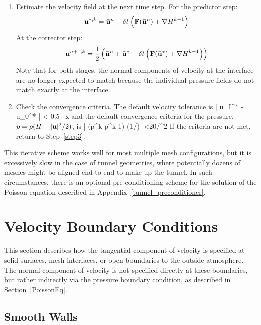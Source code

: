 \begin{enumerate}
\item Estimate the velocity field at the next time step. For the predictor step:
\begin{equation}
\label{eqn_RK1}
\mathbf{u}^{*,k} = \bar{\mathbf{u}}^n - \delta t \left( \mathbf{F}(\bar{\mathbf{u}}^n) + {\nabla H}^{k-1} \right)
\end{equation}
At the corrector step:
\begin{equation}
\label{eqn_RK2}
\mathbf{u}^{n+1,k} = \frac{1}{2} \left( \bar{\mathbf{u}}^n + \bar{\mathbf{u}}^* - \delta t \left( \mathbf{F}(\bar{\mathbf{u}}^*) + {\nabla H}^{k-1} \right) \right)
\end{equation}
Note that for both stages, the normal components of velocity at the interface are no longer expected to match because the individual pressure fields do not match exactly at the interface.

\item Check the convergence criteria. The default velocity tolerance is
   \be
      \left| u_I^* - u_0^* \right| < 0.5 \, \delta x
   \ee
    and the default convergence criteria for the pressure, $p=\rho(H-|{\mathbf{u}}|^2/2)$, is
   \be
      \left| \nabla \cdot (p^k-p^{k-1}) \nabla (1/\rho) \right|<20/\dx^2
   \ee
   If the criteria are not met, return to Step~\ref{step3}.
\end{enumerate}
This iterative scheme works well for most multiple mesh configurations, but it is excessively slow in the case of tunnel geometries, where potentially dozens of meshes might be aligned end to end to make up the tunnel. In such circumstances, there is an optional pre-conditioning scheme for the solution of the Poisson equation described in Appendix~\ref{tunnel_preconditioner}.




\newpage
\section{Velocity Boundary Conditions}
\label{info:velocity_bc}

This section describes how the tangential component of velocity is specified at solid surfaces, mesh interfaces, or open boundaries to the outside atmosphere. The normal component of velocity is not specified directly at these boundaries, but rather indirectly via the pressure boundary condition, as described in Section~\ref{PoissonEq}.

\subsection{Smooth Walls}
\label{smooth_wall_model}


